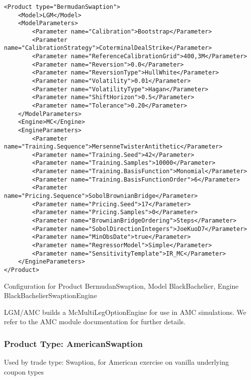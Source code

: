 \begin{longlisting}
\begin{verbatim}
<Product type="BermudanSwaption">
    <Model>LGM</Model>
    <ModelParameters>
        <Parameter name="Calibration">Bootstrap</Parameter>
        <Parameter name="CalibrationStrategy">CoterminalDealStrike</Parameter>
        <Parameter name="ReferenceCalibrationGrid">400,3M</Parameter>
        <Parameter name="Reversion">0.0</Parameter>
        <Parameter name="ReversionType">HullWhite</Parameter>
        <Parameter name="Volatility">0.01</Parameter>
        <Parameter name="VolatilityType">Hagan</Parameter>
        <Parameter name="ShiftHorizon">0.5</Parameter>
        <Parameter name="Tolerance">0.20</Parameter>
    </ModelParameters>
    <Engine>MC</Engine>
    <EngineParameters>
        <Parameter name="Training.Sequence">MersenneTwisterAntithetic</Parameter>
        <Parameter name="Training.Seed">42</Parameter>
        <Parameter name="Training.Samples">10000</Parameter>
        <Parameter name="Training.BasisFunction">Monomial</Parameter>
        <Parameter name="Training.BasisFunctionOrder">6</Parameter>
        <Parameter name="Pricing.Sequence">SobolBrownianBridge</Parameter>
        <Parameter name="Pricing.Seed">17</Parameter>
        <Parameter name="Pricing.Samples">0</Parameter>
        <Parameter name="BrownianBridgeOrdering">Steps</Parameter>
        <Parameter name="SobolDirectionIntegers">JoeKuoD7</Parameter>
        <Parameter name="MinObsDate">true</Parameter>
        <Parameter name="RegressorModel">Simple</Parameter>
        <Parameter name="SensitivityTemplate">IR_MC</Parameter>
    </EngineParameters>
</Product>
\end{verbatim}
\caption{Configuration for Product BermudanSwaption, Model BlackBachelier, Engine BlackBachelierSwaptionEngine}
\label{lst:peconfig_BermudanSwaption_LGM_MC}
\end{longlisting}

LGM/AMC builds a McMultiLegOptionEngine for use in AMC simulations. We refer to the AMC module documentation for further
details.

\subsubsection{Product Type: AmericanSwaption}

Used by trade type: Swaption, for American exercise on vanilla underlying coupon types

